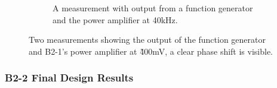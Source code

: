 \begin{figure}[H]
\begin{subfigure}{.5\textwidth}
    \captionsetup{justification=raggedright, labelfont=bf}
    \caption{A measurement with output from a function generator and the power amplifier at 40kHz.}
    \label{fig:40kHz}
\end{subfigure}
\caption{Two measurements showing the output of the function generator and B2-1's power amplifier at \~ 400mV, a clear phase shift is visible.}




\end{figure}



\subsubsection{B2-2 Final Design Results}

